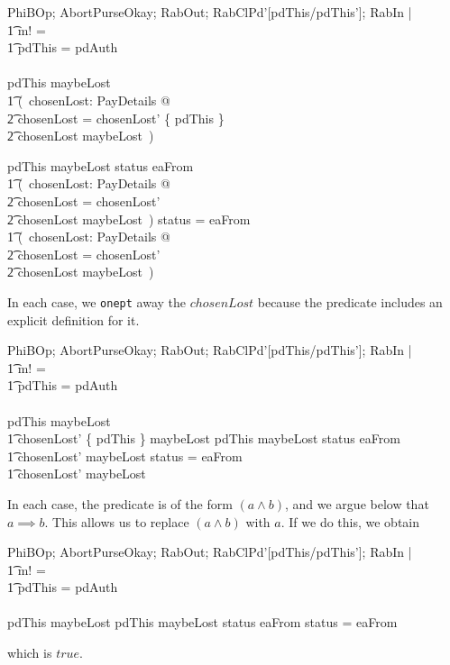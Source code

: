 \begin{gzed}
  PhiBOp; AbortPurseOkay; RabOut; RabClPd'[pdThis/pdThis']; RabIn |
  \\ %
  \t1 m! = \bot
  \\ %
  \t1 \land pdThis = pdAuth
  \\ %
  \shows
  \\ %
  pdThis \in maybeLost
  \\ %
  \t1 \land (~\exists  chosenLost: \power PayDetails @
  \\ %
  \t2 chosenLost = chosenLost' \cup \{ pdThis \}
  \\ %
  \t2 \land chosenLost \subseteq maybeLost~)

  \also %
  \lor pdThis \notin maybeLost \land status \neq eaFrom
  \\ %
  \t1 \land (~\exists  chosenLost: \power PayDetails @
  \\ %
  \t2 chosenLost = chosenLost'
  \\ %
  \t2 \land chosenLost \subseteq maybeLost~)
  \also %
  \lor status = eaFrom
  \\ %
  \t1 \land (~\exists  chosenLost: \power PayDetails @
  \\ %
  \t2 chosenLost = chosenLost'
  \\ %
  \t2 \land chosenLost \subseteq maybeLost~)
\end{gzed}
In each case, we \texttt{onept} away the $chosenLost$ because the
predicate includes an explicit definition for it.
\begin{gzed}
  PhiBOp; AbortPurseOkay; RabOut; RabClPd'[pdThis/pdThis']; RabIn |
  \\ %
  \t1 m! = \bot
  \\ %
  \t1 \land pdThis = pdAuth
  \\ %
  \shows
  \\ %
  pdThis \in maybeLost
  \\ %
  \t1 \land chosenLost' \cup \{ pdThis \} \subseteq maybeLost
  \also %
  \lor pdThis \notin maybeLost \land status \neq eaFrom
  \\ %
  \t1 \land chosenLost' \subseteq maybeLost
  \also %
  \lor status = eaFrom
  \\ %
  \t1 \land chosenLost' \subseteq maybeLost
\end{gzed}
In each case, the predicate is of the form $(a \land b)$, and we
argue below that $a \implies b$. This allows us to replace $(a \land
b)$ with $a$.  If we do this, we obtain
\begin{gzed}
  PhiBOp; AbortPurseOkay; RabOut; RabClPd'[pdThis/pdThis']; RabIn |
  \\ %
  \t1 m! = \bot
  \\ %
  \t1 \land pdThis = pdAuth
  \\ %
  \shows
  \\ %
  pdThis \in maybeLost
  \also %
  \lor pdThis \notin maybeLost \land status \neq eaFrom
  \also %
  \lor status = eaFrom
\end{gzed}
which is $true$.

